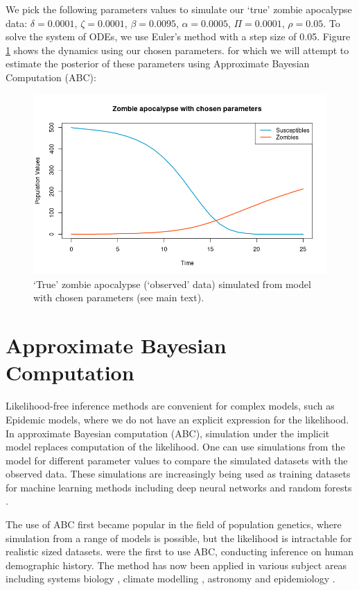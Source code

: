 \documentclass[]{article}
\begin{document}
	We pick the following parameters values to simulate our `true' zombie apocalypse data: $\delta=0.0001$, $\zeta= 0.0001$, $\beta=0.0095$, $\alpha=0.0005$, $\Pi=0.0001$, $\rho=0.05$. To solve the system of ODEs, we use Euler's method with a step size of 0.05. Figure \ref{true_epidemic} shows the dynamics using our chosen parameters. 
	for which we will attempt to estimate the posterior of these parameters using Approximate Bayesian Computation (ABC):
	
	\begin{figure}[H]
		\centering
		\includegraphics[width=0.8\linewidth]{../Figures/true_epidemic}
		\caption{`True' zombie apocalypse (`observed' data) simulated from model with chosen parameters (see main text).}
		\label{true_epidemic}
	\end{figure}
	
	\section{Approximate Bayesian Computation}
	
	Likelihood-free inference methods are convenient for complex models, such as Epidemic models, where we do not have an explicit expression for the likelihood. In approximate Bayesian computation (ABC), simulation under the implicit model replaces computation of the likelihood. One can use simulations from the model for different parameter values to compare the simulated datasets with the observed data. These simulations are increasingly being used as training datasets for machine learning methods including deep neural networks \citep{RN6} and random forests \citep{RN8}. 
	
	The use of ABC first became popular in the field of population genetics, where simulation from a range of models is possible, but the likelihood is intractable for realistic sized datasets. \cite{RN57} were the first to use ABC, conducting inference on human demographic history. The method has now been applied in various subject areas including systems biology \citep{RN60}, climate modelling \citep{RN61}, astronomy \citep{RN62} and epidemiology \citep{RN10}.
	
\end{document}

